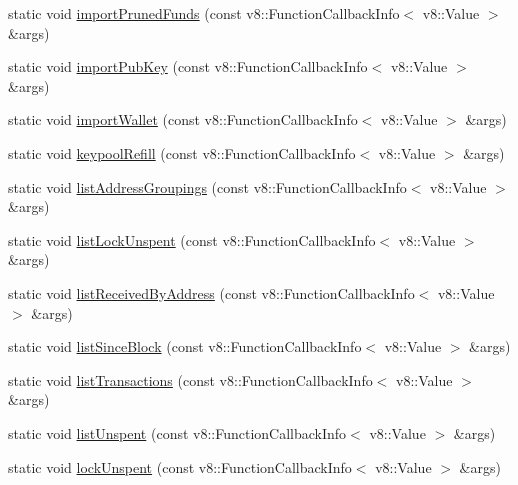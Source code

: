 \begin{DoxyCompactItemize}
\item 
static void \mbox{\hyperlink{class_rad_j_a_v_1_1_blockchain_v1_a8fbb8a8d4bea7da6071be067d33a9f60}{import\+Pruned\+Funds}} (const v8\+::\+Function\+Callback\+Info$<$ v8\+::\+Value $>$ \&args)
\item 
static void \mbox{\hyperlink{class_rad_j_a_v_1_1_blockchain_v1_a57db98129acac02a278ec42079f4324e}{import\+Pub\+Key}} (const v8\+::\+Function\+Callback\+Info$<$ v8\+::\+Value $>$ \&args)
\item 
static void \mbox{\hyperlink{class_rad_j_a_v_1_1_blockchain_v1_a4ec5426c3aad9c4ca96b5a533a5db10e}{import\+Wallet}} (const v8\+::\+Function\+Callback\+Info$<$ v8\+::\+Value $>$ \&args)
\item 
static void \mbox{\hyperlink{class_rad_j_a_v_1_1_blockchain_v1_a98cb8eff20b72d9fad16259c8caf934a}{keypool\+Refill}} (const v8\+::\+Function\+Callback\+Info$<$ v8\+::\+Value $>$ \&args)
\item 
static void \mbox{\hyperlink{class_rad_j_a_v_1_1_blockchain_v1_a630ec569dba6b7d191b24f45c2c3a4a3}{list\+Address\+Groupings}} (const v8\+::\+Function\+Callback\+Info$<$ v8\+::\+Value $>$ \&args)
\item 
static void \mbox{\hyperlink{class_rad_j_a_v_1_1_blockchain_v1_a99f40da4b863836c839cd6f40cde9a01}{list\+Lock\+Unspent}} (const v8\+::\+Function\+Callback\+Info$<$ v8\+::\+Value $>$ \&args)
\item 
static void \mbox{\hyperlink{class_rad_j_a_v_1_1_blockchain_v1_adfa0c0d78f13b95767fde5338de4a354}{list\+Received\+By\+Address}} (const v8\+::\+Function\+Callback\+Info$<$ v8\+::\+Value $>$ \&args)
\item 
static void \mbox{\hyperlink{class_rad_j_a_v_1_1_blockchain_v1_adedd76e84b186b32360ec86b2698a588}{list\+Since\+Block}} (const v8\+::\+Function\+Callback\+Info$<$ v8\+::\+Value $>$ \&args)
\item 
static void \mbox{\hyperlink{class_rad_j_a_v_1_1_blockchain_v1_ad9f96388647298b9a668dcf9d4bd590e}{list\+Transactions}} (const v8\+::\+Function\+Callback\+Info$<$ v8\+::\+Value $>$ \&args)
\item 
static void \mbox{\hyperlink{class_rad_j_a_v_1_1_blockchain_v1_ab165a7195e214c520f4310f386b08dc1}{list\+Unspent}} (const v8\+::\+Function\+Callback\+Info$<$ v8\+::\+Value $>$ \&args)
\item 
static void \mbox{\hyperlink{class_rad_j_a_v_1_1_blockchain_v1_ad9e76bdcb21947b8ea50892d88f01c75}{lock\+Unspent}} (const v8\+::\+Function\+Callback\+Info$<$ v8\+::\+Value $>$ \&args)
\item 

\end{DoxyCompactItemize}
